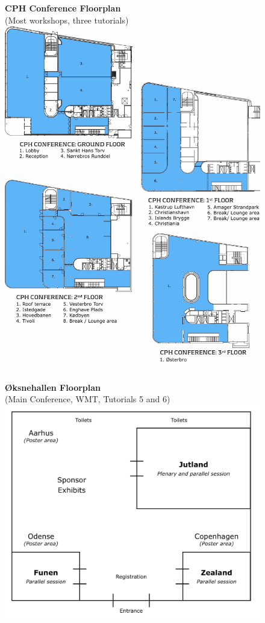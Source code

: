 \begin{figure}[p]
\centering
\textbf{CPH Conference Floorplan}\\
(Most workshops, three tutorials)
\vspace{3em}
\includegraphics[width=\textwidth]{content/fmatter/floorplan_DGI_w_grid.pdf}
\end{figure}

\begin{figure}[p]
\centering
\textbf{Øksnehallen Floorplan}\\
(Main Conference, WMT, Tutorials 5 and 6)
\vspace{10em}
\includegraphics[width=\textwidth]{content/fmatter/floorplan_oeksnehallen.png}
\end{figure}
